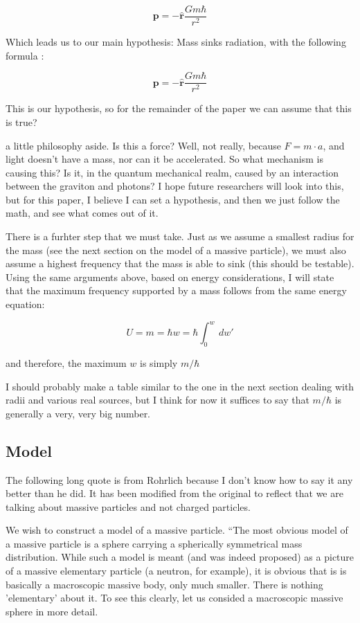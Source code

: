 \documentclass {article}
\renewcommand\vec{\mathbf}
\let\OldHat\hat
\renewcommand{\hat}[1]{\OldHat{\mathbf{#1}}}
\begin{document}
$$\vec p = - \hat r \frac {Gm \hbar} {r^2} $$


Which leads us to our main hypothesis:  Mass sinks radiation, with the following formula :

$$\boxed{ \vec p = - \hat r \frac {Gm \hbar} {r^2} } $$

This is our hypothesis, so for the remainder of the paper we can assume that this is true?

a little philosophy aside. Is this a force? Well, not really, because $F = m \cdot a$, and light doesn't have a mass, nor can it be accelerated. So what mechanism is causing this? Is it, in the quantum mechanical realm, caused by an interaction between the graviton and photons? I hope future researchers will look into this, but for this paper, I believe I can set a hypothesis, and then we just follow the math, and see what comes out of it.

\vspace{10pt}

There is a furhter step that we must take. Just as we assume a smallest radius for the mass (see the next section on the model of a massive particle), we must also assume a highest frequency that the mass is able to sink (this should be testable). Using the same arguments above, based on energy considerations, I will state that the maximum frequency supported by a mass follows from the same energy equation:

$$U = m = \hbar w = \hbar \int_0^w ~dw'$$

\noindent and therefore, the maximum $w$ is simply $m / \hbar$

I should probably make a table similar to the one in the next section dealing with radii and various real sources, but I think for now it suffices to say that $m / \hbar $ is generally a very, very big number.



\newpage
\subsection{Model}
The following long quote is from Rohrlich because I don't know how to say it any better than he did. It has been modified from the original to reflect that we are talking about massive particles and not charged particles.

We wish to construct a model of a massive particle. ``The most obvious model of a massive particle is a sphere carrying a spherically symmetrical mass distribution. While such a model is meant (and was indeed proposed) as a picture of a massive elementary particle (a neutron, for example), it is obvious that is is basically a macroscopic massive body, only much smaller. There is nothing 'elementary' about it. To see this clearly, let us consided a macroscopic massive sphere in more detail.
\end{document}
